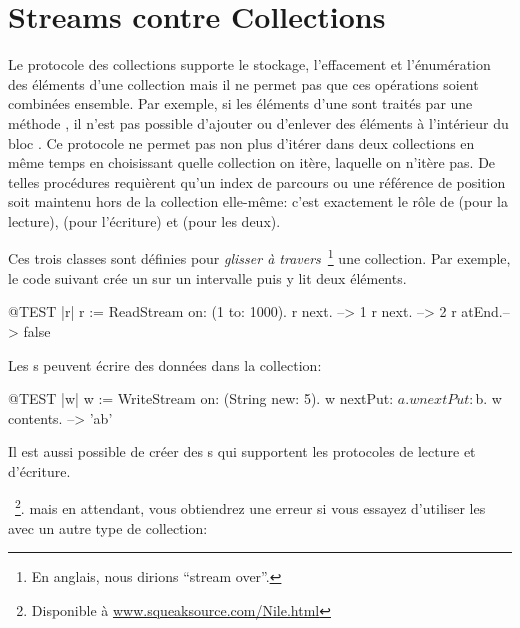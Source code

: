 \documentclass[a4paper,10pt,twoside]{book}
\begin{document}
\section{Streams contre Collections}

Le protocole des collections supporte le stockage, l'effacement et l'\'enum\'eration
des \'el\'ements d'une collection mais il ne permet pas que ces op\'erations
soient combin\'ees ensemble. Par exemple, si les \'el\'ements d'une 
 sont trait\'es par une m\'ethode , il n'est pas possible d'ajouter ou d'enlever des \'el\'ements
\`a l'int\'erieur du bloc .
Ce protocole ne permet pas non plus d'it\'erer dans deux collections
en m\^eme temps en choisissant quelle collection on itère, laquelle on n'itère pas.
De telles proc\'edures requi\`erent qu'un index de parcours ou une r\'ef\'erence
de position soit maintenu hors de la collection elle-m\^eme:
c'est exactement le r\^ole de  
 (pour la lecture),  (pour l'\'ecriture) et  (pour les deux).

Ces trois classes sont d\'efinies pour \emph{glisser à travers}~\footnote{En anglais, nous dirions ``stream over''.} une collection.
Par exemple, le code suivant cr\'ee un \stream sur un intervalle puis y lit deux \'el\'ements.
\begin{code}{@TEST |r|}
r := ReadStream on: (1 to: 1000).
r next.   --> 1
r next.   --> 2
r atEnd.--> false
\end{code}

Les s peuvent \'ecrire des donn\'ees dans la collection:
\begin{code}{@TEST |w|}
w := WriteStream on: (String new: 5).
w nextPut: $a.
w nextPut: $b.
w contents. -->  'ab'
\end{code}

Il est aussi possible de cr\'eer des s qui supportent
les protocoles de lecture et d'\'ecriture.

~\footnote{Disponible \`a \url{www.squeaksource.com/Nile.html}}. mais en attendant, vous obtiendrez une erreur
si vous essayez d'utiliser les \streams avec un autre type de collection:
\end{document}
